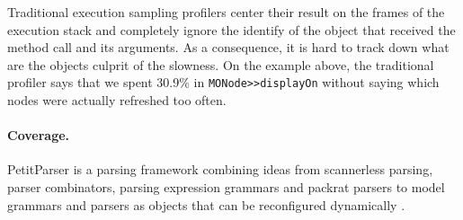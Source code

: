 \documentclass[runningheads]{llncs}
\newcommand{\ct}{\lstinline[backgroundcolor=\color{white},basicstyle=\footnotesize\ttfamily]}
\newcommand{\ab}[1]{\nb{Alexandre}{blue}{#1}}
\newcommand{\lr}[1]{\nb{Lukas}{orange}{#1}}
\newcommand{\jr}[1]{\nb{Jorge}{cyan}{#1}}
\begin{document}
Traditional execution sampling profilers center their result on the frames of the execution stack and completely ignore the identify of the object that received the method call and its arguments. As a consequence, it is hard to track down what are the objects culprit of the slowness. On the example above, the traditional profiler says that we spent 30.9\% in \ct{MONode>>displayOn} without saying which nodes were actually refreshed too often.


\paragraph{Coverage.} 
PetitParser is a parsing framework combining ideas from scannerless parsing, parser combinators, parsing expression grammars and packrat parsers to model grammars and parsers as objects that can be reconfigured dynamically \cite{Reng10c}. %
\end{document}
